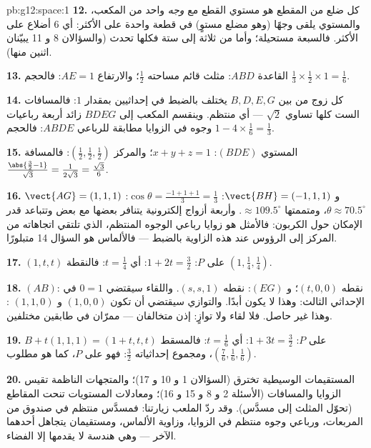 \begin{solution}{pb:g12:space:1}
\textbf{12.} كل ضلع من المقطع هو 
مستوي القطع مع \emph{وجه} واحد من المكعب، والمستوي
يلقى وجهًا (وهو مضلع مستوٍ) في قطعة واحدة على الأكثر:
أي $6$ أضلاع على الأكثر. فالسبعة مستحيلة؛ وأما من ثلاثة إلى ستة فكلها
تحدث (والسؤالان 8 و 11 يبيّنان اثنين منها).

\textbf{13.} القاعدة $ABD$: مثلث قائم مساحته $\frac12$؛
والارتفاع $AE = 1$: فالحجم
$\frac13 \times \frac12 \times 1 = \frac16$.

\textbf{14.} كل زوج من بين $B, D, E, G$ يختلف بالضبط في
إحداثيين بمقدار $1$: فالمسافات الست كلها تساوي $\sqrt2$ ---
أي منتظم. وينقسم المكعب إلى $BDEG$ زائد أربعة رباعيات وجوه
في الزوايا مطابقة للرباعي $ABDE$: فالحجم
$1 - 4 \times \frac16 = \frac13$.

\textbf{15.} المستوي $(BDE)$: $x + y + z = 1$؛ والمركز
$\left(\frac12,\frac12,\frac12\right)$: فالمسافة
$\frac{\abs{\frac32 - 1}}{\sqrt3} = \frac{1}{2\sqrt3} =
\frac{\sqrt3}{6}$.

\textbf{16.} $\vect{AG} = (1,1,1)$ و
$\vect{BH} = (-1,1,1)$: $\cos\theta = \frac{-1 + 1 + 1}{3} =
\frac13$: $\theta \approx 70.5^\circ$، ومتممتها
$\approx 109.5^\circ$. وأربعة أزواج إلكترونية يتنافر بعضها مع بعض
وتتباعد قدر الإمكان حول الكربون: فالأمثل
هو زوايا رباعي الوجوه المنتظم، الذي تلتقي اتجاهاته من
المركز إلى الرؤوس عند هذه الزاوية بالضبط ---
فالألماس هو السؤال 14 متبلورًا.

\textbf{17.} $(1, t, t)$ على $P$: $1 + 2t = \frac32$:
أي $t = \frac14$: فالنقطة $\left(1, \frac14, \frac14\right)$.

\textbf{18.} $(AB)$: نقطه $(t, 0, 0)$؛ و $(EG)$: نقطه
$(s, s, 1)$. واللقاء سيقتضي $0 = 1$ في الإحداثي
الثالث: وهذا لا يكون أبدًا. والتوازي سيقتضي أن تكون $(1,0,0)$ و
$(1,1,0)$ : وهذا غير حاصل. فلا لقاء ولا توازٍ: إذن متخالفان
--- ممرّان في طابقين مختلفين.

\textbf{19.} $B + t(1,1,1) = (1 + t, t, t)$ على $P$:
$1 + 3t = \frac32$: أي $t = \frac16$: فالمسقط
$\left(\frac76, \frac16, \frac16\right)$، ومجموع إحداثياته
$\frac32$: فهو على $P$، كما هو مطلوب.

\textbf{20.} المستقيمات الوسيطية تخترق (السؤالان 1 و 10 و 17)؛
والمتجهات الناظمة تقيس الزوايا والمسافات (الأسئلة 2 و 8 و
15 و 16)؛ ومعادلات المستويات تنحت المقاطع (تحوّل المثلث
إلى مسدَّس). وقد ردّ الملعب زيارتنا: فمسدَّس
منتظم في صندوق من المربعات، ورباعي وجوه منتظم في
الزوايا، وزاوية الألماس، ومستقيمان يتجاهل أحدهما الآخر
--- وهي هندسة لا يقدمها إلا الفضاء.
\end{solution}
